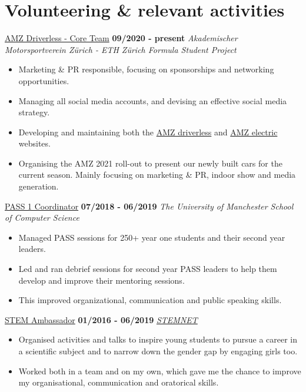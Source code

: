 \documentclass[]{friggeri-cv}
\begin{document}

\section{\color{red}Volunteering \color{gray} \& relevant activities}
\entry
    {}
    {\href{https://driverless.amzracing.ch}{AMZ Driverless - Core Team}}
    {\textbf{09/2020 - present}}
    {\emph{Akademischer Motorsportverein Zürich - ETH Zürich Formula Student Project}}
    \begin{itemize}
        \item Marketing \& PR responsible, focusing on sponsorships and networking opportunities.
        \item Managing all social media accounts, and devising an effective social media strategy.
        \item Developing and maintaining both the \href{https://driverless.amzracing.ch/en/home}{AMZ driverless} and \href{https://electric.amzracing.ch/en/home}{AMZ electric} websites.
        \item Organising the AMZ 2021 roll-out to present our newly built cars for the current season. Mainly focusing on marketing \& PR, indoor show and media generation.
    \end{itemize}
\entry
    {}
    {\href{http://www.pass.manchester.ac.uk/}{PASS 1 Coordinator}}
    {\textbf{07/2018 - 06/2019}}
    {\emph{The University of Manchester School of Computer Science}}
    \begin{itemize}
        \item Managed PASS sessions for 250+ year one students and their second year leaders.
        \item Led and ran debrief sessions for second year PASS leaders to help them develop and improve their mentoring sessions.
        \item This improved organizational, communication and public speaking skills.\\
    \end{itemize}
\entry
    {}
    {\href{http://www.stemnet.org.uk/ambassadors/}{STEM Ambassador}}
    {\textbf{01/2016 - 06/2019}}
    {\emph{\href{http://www.stemnet.org.uk/}{STEMNET}}}
    \begin{itemize}
        \item Organised activities and talks to inspire young students to pursue a career in a scientific subject and to narrow down the gender gap by engaging girls too.
        \item Worked both in a team and on my own, which gave me the chance to improve my organisational, communication and oratorical skills.\\
    \end{itemize}
\end{document}
